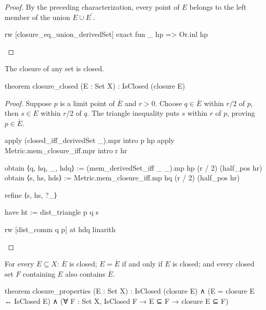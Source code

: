\begin{proof}
  By the preceding characterization, every point of $E$ belongs to the left member of the union
  $E\cup E^{\prime}$.

  \begin{lean}
    rw [closure_eq_union_derivedSet]
    exact fun _ hp => Or.inl hp
  \end{lean}

\end{proof}

\begin{lemma}
  \label{an1:lem:closure-closed}
  The closure of any set is closed.

  \begin{lean}
    theorem closure_closed (E : Set X) : IsClosed (closure E)
  \end{lean}
\end{lemma}

\begin{proof}
  Suppose $p$ is a limit point of $\overline E$ and $r>0$.
  Choose $q\in\overline E$ within $r/2$ of $p$, then $s\in E$ within $r/2$ of $q$.
  The triangle inequality puts $s$ within $r$ of $p$, proving $p\in\overline E$.

  \begin{lean}
    apply (closed_iff_derivedSet _).mpr
    intro p hp
    apply Metric.mem_closure_iff.mpr
    intro r hr

    obtain ⟨q, hq, _, hdq⟩ := (mem_derivedSet_iff _ _).mp hp (r / 2) (half_pos hr)
    obtain ⟨s, hs, hds⟩ := Metric.mem_closure_iff.mp hq (r / 2) (half_pos hr)

    refine ⟨s, hs, ?_⟩

    have ht := dist_triangle p q s

    rw [dist_comm q p] at hdq
    linarith
  \end{lean}

\end{proof}

\begin{proposition}
  \label{an1:thm:properties-of-closure}
  For every $E\subseteq X$: $\overline E$ is closed; $E=\overline E$ if and only if $E$ is closed;
  and every closed set $F$ containing $E$ also contains $\overline E$.

  \begin{lean}
    theorem closure_properties (E : Set X) :
        IsClosed (closure E) ∧ (E = closure E ↔ IsClosed E) ∧
        (∀ F : Set X, IsClosed F → E ⊆ F → closure E ⊆ F)
  \end{lean}
\end{proposition}

